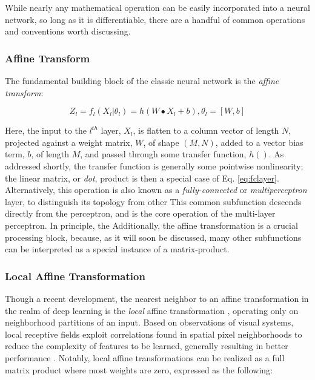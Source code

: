 While nearly any mathematical operation can be easily incorporated into a neural network, so long as it is differentiable, there are a handful of common operations and conventions worth discussing.

\subsubsection{Affine Transform}

The fundamental building block of the classic neural network is the \emph{affine transform}:

\begin{equation}
\label{eq:fclayer}
Z_l = f_l(X_l \vert \theta_l) = h( W \bullet X_{l} + b), \theta_l = [W, b]
\end{equation}

\noindent Here, the input to the $l^{th}$ layer, $X_l$, is flatten to a column vector of length $N$, projected against a weight matrix, $W$, of shape $(M, N)$, added to a vector bias term, $b$, of length $M$, and passed through some transfer function, $h()$.
As addressed shortly, the transfer function is generally some pointwise nonlinearity;
the linear matrix, or \emph{dot}, product is then a special case of Eq. \ref{eq:fclayer}.
Alternatively, this operation is also known as a \emph{fully-connected} or \emph{multiperceptron} layer, to distinguish its topology from other
This common subfunction descends directly from the perceptron, and is the core operation of the multi-layer perceptron.
In principle, the
Additionally, the affine transformation is a crucial processing block, because, as it will soon be discussed, many other subfunctions can be interpreted as a special instance of a matrix-product.


\subsubsection{Local Affine Transformation}

Though a recent development, the nearest neighbor to an affine transformation in the realm of deep learning is the \emph{local} affine transformation \cite{someone}, operating only on neighborhood partitions of an input.
Based on observations of visual systems, local receptive fields exploit correlations found in spatial pixel neighborhoods to reduce the complexity of features to be learned, generally resulting in better performance \cite{who}.
Notably, local affine transformations can be realized as a full matrix product where most weights are zero, expressed as the following:

